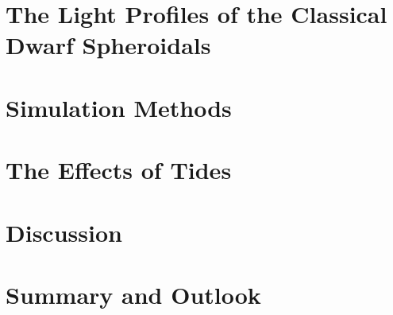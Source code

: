 \documentclass[12pt,oneside,letterpaper]{report}
\begin{document}
\chapter{The Light Profiles of the Classical Dwarf Spheroidals}\label{sec:observations}


\chapter{Simulation Methods}\label{sec:methods}


\chapter{The Effects of Tides}\label{sec:results}


%

\chapter{Discussion}\label{sec:discussion}


\chapter{Summary and Outlook}\label{sec:summary}


\newpage

 



\appendix




\end{document}
